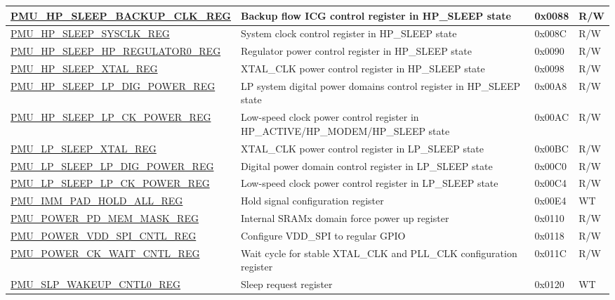 \begin{longtable}{ | l | p{6cm} | p{1.3cm} | p{1.5cm} | }
\hyperref[regdesc:PMUHPSLEEPBACKUPCLKREG]{PMU\_HP\_SLEEP\_BACKUP\_CLK\_REG} & Backup flow ICG control register in HP\_SLEEP state & 0x0088 & R/W \\ \hline
\hyperref[regdesc:PMUHPSLEEPSYSCLKREG]{PMU\_HP\_SLEEP\_SYSCLK\_REG} & System clock control register in HP\_SLEEP state & 0x008C & R/W \\ \hline
\hyperref[regdesc:PMUHPSLEEPHPREGULATOR0REG]{PMU\_HP\_SLEEP\_HP\_REGULATOR0\_REG} & Regulator power control register in HP\_SLEEP state & 0x0090 & R/W \\ \hline
\hyperref[regdesc:PMUHPSLEEPXTALREG]{PMU\_HP\_SLEEP\_XTAL\_REG} & XTAL\_CLK power control register in HP\_SLEEP state & 0x0098 & R/W \\ \hline
\hyperref[regdesc:PMUHPSLEEPLPDIGPOWERREG]{PMU\_HP\_SLEEP\_LP\_DIG\_POWER\_REG} & LP system digital power domains control register in HP\_SLEEP state & 0x00A8 & R/W \\ \hline
\hyperref[regdesc:PMUHPSLEEPLPCKPOWERREG]{PMU\_HP\_SLEEP\_LP\_CK\_POWER\_REG} & Low-speed clock power control register in HP\_ACTIVE/HP\_MODEM/HP\_SLEEP state & 0x00AC & R/W \\ \hline
\hyperref[regdesc:PMULPSLEEPXTALREG]{PMU\_LP\_SLEEP\_XTAL\_REG} & XTAL\_CLK power control register in LP\_SLEEP state & 0x00BC & R/W \\ \hline
\hyperref[regdesc:PMULPSLEEPLPDIGPOWERREG]{PMU\_LP\_SLEEP\_LP\_DIG\_POWER\_REG} & Digital power domain control register in LP\_SLEEP state & 0x00C0 & R/W \\ \hline
\hyperref[regdesc:PMULPSLEEPLPCKPOWERREG]{PMU\_LP\_SLEEP\_LP\_CK\_POWER\_REG} & Low-speed clock power control register in LP\_SLEEP state & 0x00C4 & R/W \\ \hline
\hyperref[regdesc:PMUIMMPADHOLDALLREG]{PMU\_IMM\_PAD\_HOLD\_ALL\_REG} & Hold signal configuration register & 0x00E4 & WT \\ \hline
\hyperref[regdesc:PMUPOWERPDMEMMASKREG]{PMU\_POWER\_PD\_MEM\_MASK\_REG} & Internal SRAMx domain force power up register & 0x0110 & R/W \\ \hline
\hyperref[regdesc:PMUPOWERVDDSPICNTLREG]{PMU\_POWER\_VDD\_SPI\_CNTL\_REG} & Configure VDD\_SPI to regular GPIO & 0x0118 & R/W \\ \hline
\hyperref[regdesc:PMUPOWERCKWAITCNTLREG]{PMU\_POWER\_CK\_WAIT\_CNTL\_REG} & Wait cycle for stable XTAL\_CLK and PLL\_CLK configuration register & 0x011C & R/W \\ \hline
\hyperref[regdesc:PMUSLPWAKEUPCNTL0REG]{PMU\_SLP\_WAKEUP\_CNTL0\_REG} & Sleep request register & 0x0120 & WT \\ \hline

\end{longtable}
